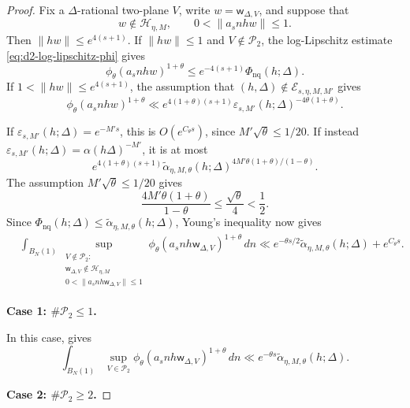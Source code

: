 \documentclass[reqno,11pt]{amsart}
\theoremstyle{definition}
\theoremstyle{remark}
\numberwithin{equation}{section}
\begin{document}
\begin{proof}
Fix a $\Delta$-rational two-plane $V$, write
$w=\mathsf w_{\Delta,V}$, and suppose that
$$
w\notin\mathcal H_{\eta,M},
\qquad
0<\|a_snhw\|\le1.
$$
Then $\|hw\|\le e^{4(s+1)}$. If $\|hw\|\le1$ and
$V\notin\mathcal P_2$, the log-Lipschitz estimate
\eqref{eq:d2-log-lipschitz-phi} gives
$$
\phi_\theta(a_snhw)^{1+\theta}
\le
e^{-4(s+1)}\Phi_{\mathrm{nq}}(h;\Delta).
$$
If $1<\|hw\|\le e^{4(s+1)}$, the assumption that
$(h,\Delta)\notin\mathcal E_{s,\eta,M,M'}$ gives
$$
\phi_\theta(a_snhw)^{1+\theta}
\ll
e^{4(1+\theta)(s+1)}
\varepsilon_{s,M'}(h;\Delta)^{-4\theta(1+\theta)}.
$$

If $\varepsilon_{s,M'}(h;\Delta)=e^{-M's}$, this is
$O(e^{C_\theta s})$, since $M'\sqrt\theta\le1/20$. If instead
$\varepsilon_{s,M'}(h;\Delta)=\alpha(h\Delta)^{-M'}$, it is at most
$$
e^{4(1+\theta)(s+1)}
\widetilde\alpha_{\eta,M,\theta}(h;\Delta)^{
4M'\theta(1+\theta)/(1-\theta)}.
$$
The assumption $M'\sqrt\theta\le1/20$ gives
$$
\frac{4M'\theta(1+\theta)}{1-\theta}
\le
\frac{\sqrt\theta}{4}
<
\frac12.
$$
Since
$\Phi_{\mathrm{nq}}(h;\Delta)\le\widetilde\alpha_{\eta,M,\theta}(h;\Delta)$,
Young's inequality now gives
\begin{equation}\label{eq:outside-critical-competitors}
\begin{aligned}
&\int_{B_N(1)}
\sup_{\substack{V\notin\mathcal P_2:\\
\mathsf w_{\Delta,V}\notin\mathcal H_{\eta,M}\\
0<\|a_snh\mathsf w_{\Delta,V}\|\le1}}
\phi_\theta(a_snh\mathsf w_{\Delta,V})^{1+\theta}\,dn \ll
e^{-\theta s/2}
\widetilde\alpha_{\eta,M,\theta}(h;\Delta)+e^{C_\theta s}.
\end{aligned}
\end{equation}

\smallskip
\noindent\textbf{Case 1: $\#\mathcal P_2\le1$.}

In this case,  gives
$$
\int_{B_N(1)}
\sup_{V\in\mathcal P_2}
\phi_\theta(a_snh\mathsf w_{\Delta,V})^{1+\theta}\,dn
\ll
e^{-\theta s}
\widetilde\alpha_{\eta,M,\theta}(h;\Delta).
$$

\smallskip
\noindent\textbf{Case 2: $\#\mathcal P_2\ge2$.}


\end{proof}
\end{document}
